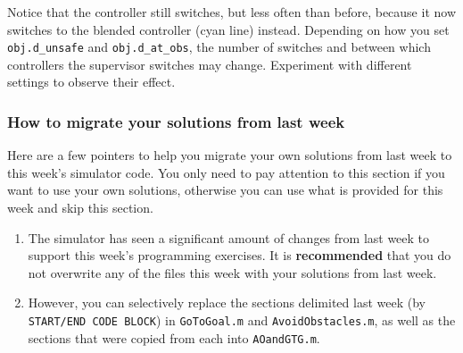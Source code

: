 \documentclass[10pt]{article}
\begin{document}
\begin{enumerate}
  Notice that the controller still switches, but less often than before, because it now switches to the blended controller (cyan line) instead. Depending on how you set \texttt{obj.d\_unsafe} and \texttt{obj.d\_at\_obs}, the number of switches and between which controllers the supervisor switches may change. Experiment with different settings to observe their effect.
    
\end{enumerate}

\subsubsection*{How to migrate your solutions from last week}
Here are a few pointers to help you migrate your own solutions from last week to this week's simulator code. You only need to pay attention to this section if you want to use your own solutions, otherwise you can use what is provided for this week and skip this section.

\begin{enumerate}
 \item The simulator has seen a significant amount of changes from last week to support this week's programming exercises. It is \textbf{recommended} that you do not overwrite any of the files this week with your solutions from last week.
 \item However, you can selectively replace the sections delimited last week (by \texttt{START/END CODE BLOCK}) in \texttt{GoToGoal.m} and \texttt{AvoidObstacles.m}, as well as the sections that were copied from each into \texttt{AOandGTG.m}.
\end{enumerate}
\end{document}
